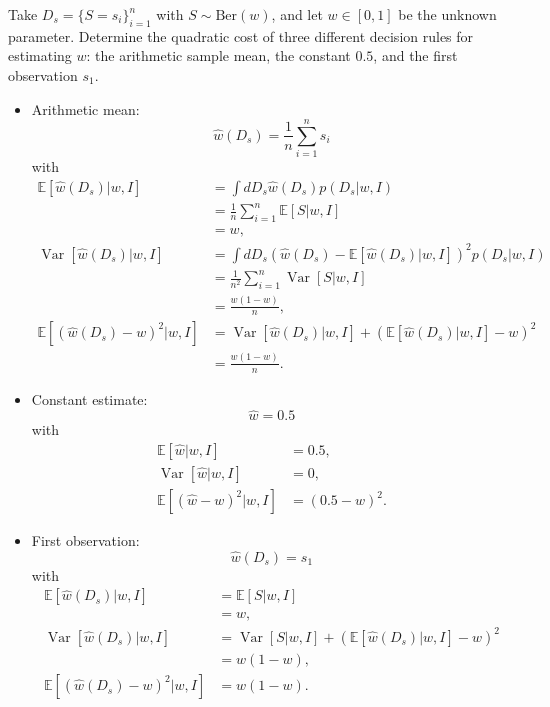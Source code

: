 \begin{example}
	Take $D_s= \{S = s_i\}_{i=1}^n$ with $S \sim \mathrm{Ber}(w)$, and let $w\in [0,1]$ be the unknown parameter. Determine the quadratic cost of three different decision rules for estimating $w$: the arithmetic sample mean, the constant $0.5$, and the first observation $s_1$.
	
	\begin{itemize}
		\item Arithmetic mean:
		\begin{equation}
			\hat{w}(D_s) = \frac{1}{n} \sum_{i=1}^n s_i
		\end{equation}
		with
		\begin{equation}
			\begin{split}
				\mathbb{E}[\hat{w}(D_s)|w,I] &=  \int dD_s \hat{w}(D_s) p(D_s|w,I)\\
				& = \frac{1}{n} \sum_{i=1}^n \mathbb{E}[S|w,I]\\
				& = w,\\
				\operatorname{Var}[\hat{w}(D_s)|w,I] & =\int dD_s (\hat{w}(D_s)-\mathbb{E}[\hat{w}(D_s)|w,I])^2 p(D_s|w,I)\\
				 &= \frac{1}{n^2} \sum_{i=1}^n \operatorname{Var}[S|w,I]\\
				 & = \frac{w(1-w)}{n},\\
				\mathbb{E}[(\hat{w}(D_s)-w)^2|w,I] &= \operatorname{Var}[\hat{w}(D_s)|w,I]+(\mathbb{E}[\hat{w}(D_s)|w,I]-w)^2\\
				& = \frac{w(1-w)}{n}.
			\end{split}
		\end{equation}
		
		\item Constant estimate:
		\begin{equation}
			\hat{w} = 0.5
		\end{equation}
		with
		\begin{equation}
			\begin{split}
				\mathbb{E}[\hat{w}|w,I] &= 0.5,\\
				\operatorname{Var}[\hat{w}|w,I] &= 0,\\
				\mathbb{E}[(\hat{w}-w)^2|w,I] &= (0.5 - w)^2.
			\end{split}
		\end{equation}
		
		\item First observation:
		\begin{equation}
			\hat{w}(D_s) = s_1
		\end{equation}
		with
		\begin{equation}
			\begin{split}
				\mathbb{E}[\hat{w}(D_s)|w,I] &= \mathbb{E}[S|w,I]\\
				& = w,\\
				\operatorname{Var}[\hat{w}(D_s)|w,I] &= \operatorname{Var}[S|w,I] +(\mathbb{E}[\hat{w}(D_s)|w,I]-w)^2\\
				&= w(1-w),\\
				\mathbb{E}[(\hat{w}(D_s)-w)^2|w,I] &= w(1-w).
			\end{split}
		\end{equation}
	\end{itemize}
	

\end{example}
